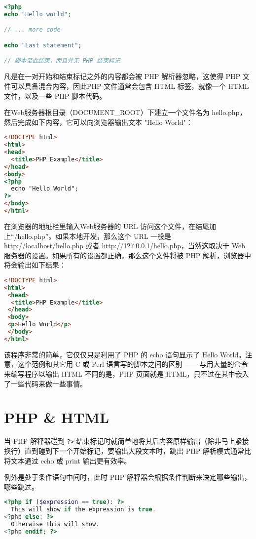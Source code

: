 \begin{lstlisting}[language=PHP]
<?php
echo "Hello world";

// ... more code

echo "Last statement";

// 脚本至此结束，而且并无 PHP 结束标记
\end{lstlisting}

凡是在一对开始和结束标记之外的内容都会被 PHP 解析器忽略，这使得 PHP 文件可以具备混合内容，因此PHP 文件通常会包含 HTML 标签，就像一个 HTML 文件，以及一些 PHP 脚本代码。

在Web服务器根目录（DOCUMENT\_ROOT）下建立一个文件名为 hello.php，然后完成如下内容，它可以向浏览器输出文本 "Hello World"：

\begin{lstlisting}[language=HTML]
<!DOCTYPE html>
<html>
<head>
  <title>PHP Example</title>
</head>
<body>
<?php
  echo "Hello World";
?>
</body>
</html>
\end{lstlisting}

在浏览器的地址栏里输入Web服务器的 URL 访问这个文件，在结尾加上“/hello.php”。如果本地开发，那么这个 URL 一般是 http://localhost/hello.php 或者 http://127.0.0.1/hello.php，当然这取决于 Web 服务器的设置。如果所有的设置都正确，那么这个文件将被 PHP 解析，浏览器中将会输出如下结果：

\begin{lstlisting}[language=HTML]
<!DOCTYPE html>
<html>
 <head>
  <title>PHP Example</title>
 </head>
 <body>
 <p>Hello World</p>
 </body>
</html>
\end{lstlisting}

该程序非常的简单，它仅仅只是利用了 PHP 的 echo 语句显示了 Hello World。注意，这个范例和其它用 C 或 Perl 语言写的脚本之间的区别~——与用大量的命令来编写程序以输出 HTML 不同的是，PHP 页面就是 HTML，只不过在其中嵌入了一些代码来做一些事情。

\section{PHP \& HTML}

当 PHP 解释器碰到 \texttt{?>} 结束标记时就简单地将其后内容原样输出（除非马上紧接换行）直到碰到下一个开始标记，要输出大段文本时，跳出 PHP 解析模式通常比将文本通过 echo 或 print 输出更有效率。

例外是处于条件语句中间时，此时 PHP 解释器会根据条件判断来决定哪些输出，哪些跳过。

\begin{lstlisting}[language=PHP]
<?php if ($expression == true): ?>
  This will show if the expression is true.
<?php else: ?>
  Otherwise this will show.
<?php endif; ?>
\end{lstlisting}

